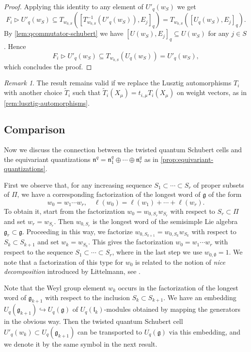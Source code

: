 \documentclass[a4paper, 12pt, reqno, english]{amsart}
\numberwithin{equation}{section}
\numberwithin{figure}{section}
\theoremstyle{plain}
\theoremstyle{plain}
\theoremstyle{plain}
\theoremstyle{plain}
\theoremstyle{plain}
\theoremstyle{definition}
\theoremstyle{definition}
\theoremstyle{definition}
\theoremstyle{remark}
\newtheorem{remark}[theorem]{Remark}
\theoremstyle{definition}
\theoremstyle{definition}
\newcommand{\Uqg}{U_q(\mathfrak{g})}
\newcommand{\Uqlk}{U_q(\mathfrak{l}_k)}
\newcommand{\lieg}{\mathfrak{g}}
\newcommand{\lien}{\mathfrak{n}}
\newcommand{\schub}{U_q}
\newcommand{\tschub}{U'_q}
\newcommand{\simpleroots}{\Pi}
\newcommand{\qnil}{\lien^q}
\begin{document}
\begin{proof}
Applying this identity to any element of $\tschub(w_S)$ we get
\[
F_i \triangleright \tschub(w_S) \subseteq 
T_{w_{0, S}} \left( [T_{w_{0, S}}^{-1}(\tschub(w_S)), E_j]_q \right) = T_{w_{0, S}} \left( [\schub(w_S), E_j]_q \right).
\]
By \cref{lem:qcommutator-schubert} we have $[U(w_S), E_j]_q \subseteq U(w_S)$ for any $j \in S$. Hence
\[
F_i \triangleright \tschub(w_S) \subseteq T_{w_{0, S}} (\schub(w_S)) = \tschub(w_S),
\]
which concludes the proof.
\end{proof}

\begin{remark}
The result remains valid if we replace the Lusztig automorphisms $T_i$ with another choice $\tilde{T}_i$ such that $\tilde{T}_i(X_\mu) = t_{i, \mu} T_i(X_\mu)$ on weight vectors, as in \cref{rem:lusztig-automorphisms}.
\end{remark}

\subsection{Comparison}

Now we discuss the connection between the twisted quantum Schubert cells and the equivariant quantizations $\qnil = \qnil_1 \oplus \cdots \oplus \qnil_r$ as in \cref{prop:equivariant-quantizations}.

First we observe that, for any increasing sequence $S_1 \subset \cdots \subset S_r$ of proper subsets of $\simpleroots$, we have a corresponding factorization of the longest word of $\lieg$ of the form
\[
w_0 = w_1 \cdots w_r, \quad
\ell(w_0) = \ell(w_1) + \cdots + \ell(w_r).
\]
To obtain it, start from the factorization $w_0 = w_{0, S_r} w_{S_r}$ with respect to $S_r \subset \simpleroots$ and set $w_r = w_{S_r}$.
Then $w_{0, S_r}$ is the longest word of the semisimple Lie algebra $\lieg_r \subset \lieg$.
Proceeding in this way, we factorize $w_{0, S_{k + 1}} = w_{0, S_k} w_{S_k}$ with respect to $S_k \subset S_{k + 1}$ and set $w_k = w_{S_k}$.
This gives the factorization $w_0 = w_1 \cdots w_r$ with respect to the sequence $S_1 \subset \cdots \subset S_r$, where in the last step we use $w_{0, \emptyset} = 1$.
We note that a factorization of this type for $w_0$ is related to the notion of \emph{nice decomposition} introduced by Littelmann, see \cite[Section 4]{littelmann}.

Note that the Weyl group element $w_k$ occurs in the factorization of the longest word of $\lieg_{k + 1}$ with respect to the inclusion $S_k \subset S_{k + 1}$.
We have an embedding $U_q(\lieg_{k + 1}) \hookrightarrow \Uqg$ of $\Uqlk$-modules obtained by mapping the generators in the obvious way.
Then the twisted quantum Schubert cell $\tschub(w_k) \subset U_q(\lieg_{k + 1})$ can be transported to $\Uqg$ via this embedding, and we denote it by the same symbol in the next result.
\end{document}
